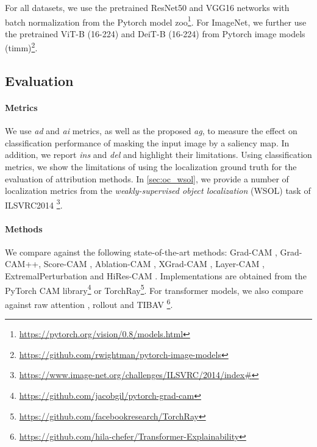 For all datasets, we use the pretrained ResNet50 \autocite{he2016deep} and VGG16 
\autocite{simonyan2015deep} networks with batch normalization \autocite{ioffe2015batch} from the 
Pytorch model zoo\footnote{\url{https://pytorch.org/vision/0.8/models.html}}. For ImageNet, we 
further use the pretrained ViT-B (16-224) \autocite{dosovitskiy2020image} and DeiT-B (16-224) 
\autocite{pmlr-v139-touvron21a} from Pytorch image models (timm)\footnote{\url{
    https://github.com/rwightman/pytorch-image-models}}.



\subsection{Evaluation}
\label{sec:eval}

\paragraph{Metrics}
We use \emph{\gls{ad}} and \emph{\gls{ai}} \autocite{chattopadhay2018grad} metrics, as well 
as the proposed \emph{\gls{ag}}, to measure the effect on classification performance of masking 
the input image by a saliency map. In addition, we report \emph{ins} and \emph{\gls{del}}  
\autocite{petsiuk2018rise} and highlight their limitations. Using classification metrics, we show 
the limitations of using the localization ground truth for the evaluation of attribution methods. 
In \autoref{sec:oc_wsol}, we provide a number of localization metrics from the 
\emph{weakly-supervised object localization} (WSOL) task of ILSVRC2014
\footnote{\url{https://www.image-net.org/challenges/ILSVRC/2014/index\#}}.

\paragraph{Methods}

We compare against the following state-of-the-art methods: Grad-CAM \autocite{selvaraju2017grad}, 
Grad-CAM++\cite{chattopadhay2018grad}, Score-CAM \autocite{wang2020score}, Ablation-CAM 
\autocite{ramaswamy2020ablation}, XGrad-CAM \autocite{fu2020axiom}, Layer-CAM 
\autocite{jiang2021layercam}, ExtremalPerturbation \autocite{fong2019understanding} 
and HiRes-CAM \autocite{draelos2020use}. Implementations are obtained from the PyTorch CAM 
library\footnote{\url{https://github.com/jacobgil/pytorch-grad-cam}} or 
TorchRay\footnote{\url{https://github.com/facebookresearch/TorchRay}}. For transformer models, 
we also compare against raw attention \autocite{dosovitskiy2020image}, 
rollout \autocite{abnar2020quantifying} and TIBAV \cite{chefer2021transformer}\footnote{\url{
https://github.com/hila-chefer/Transformer-Explainability}}.

